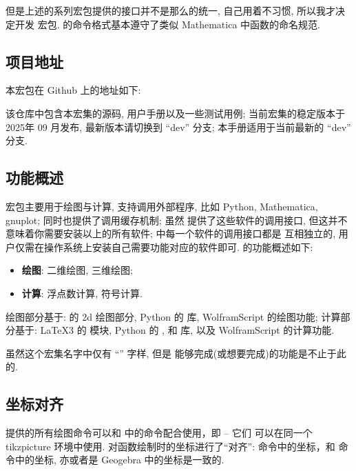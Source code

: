 \documentclass[
  hyper, 
  lang = cn, 
  class = l3doc,
  classOption={11pt},
  sect = {load=false},
]{../../zlatex/code/ztex}
\begin{document}
但是上述的系列宏包提供的接口并不是那么的统一, 自己用着不习惯, 所以我才决定开发  宏包. 
\zTikZ{} 的命令格式基本遵守了类似 Mathematica 中函数的命名规范.


\subsection{项目地址}
本宏包在 Github 上的地址如下:

\begin{center}
\end{center}

该仓库中包含本宏集的源码, 用户手册以及一些测试用例; 当前宏集的稳定版本于 2025年 09 月发布, 
最新版本请切换到 ``dev'' 分支; 本手册适用于当前最新的 ``dev'' 分支.


\subsection{功能概述}
\zTikZ{} 宏包主要用于绘图与计算, 支持调用外部程序, 比如 Python, Mathematica, gnuplot; 同时也提供了调用缓存机制; 
虽然 \ztikz{} 提供了这些软件的调用接口, 但这并不意味着你需要安装以上的所有软件; \ztikz{} 中每一个软件的调用接口都是
互相独立的, 用户仅需在操作系统上安装自己需要功能对应的软件即可. \zTikZ{} 的功能概述如下: 
\begin{itemize}
  \item \textbf{绘图}: 二维绘图, 三维绘图;
  \item \textbf{计算}: 浮点数计算, 符号计算.
\end{itemize}

绘图部分基于: \TikZ{} 的 2d 绘图部分,%
Python 的  库, WolframScript 的绘图功能; 计算部分基于: \LaTeX3 的  模块, Python 
的 ,  和  库, 以及 WolframScript 的计算功能. 

虽然这个宏集名字中仅有 ``\TikZ{}'' 字样, 但是 \ztikz{} 能够完成(或想要完成)的功能是不止于此的.


\subsection{坐标对齐}
\zTikZ{} 提供的所有绘图命令可以和 \TikZ{} 中的命令配合使用，即 -- 它们
可以在同一个 {tikzpicture} 环境中使用. \zTikZ{} 对函数绘制时的坐标进行了``对齐'':
\zTikZ{} 命令中的坐标，和 \TikZ{} 命令中的坐标, 亦或者是 Geogebra 中的坐标是一致的. 
\end{document}
